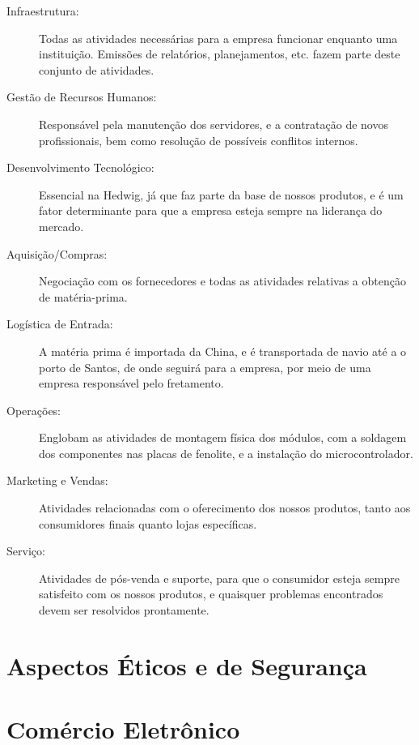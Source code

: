 \begin{description}
    \item[Infraestrutura:]Todas as atividades necessárias para a empresa funcionar enquanto uma instituição. Emissões de relatórios, planejamentos, etc. fazem parte deste conjunto de atividades.

    \item[Gestão de Recursos Humanos:]Responsável pela manutenção dos servidores, e a contratação de novos profissionais, bem como resolução de possíveis conflitos internos.

    \item[Desenvolvimento Tecnológico:]Essencial na Hedwig, já que faz parte da base de nossos produtos, e é um fator determinante para que a empresa esteja sempre na liderança do mercado.

    \item[Aquisição/Compras:]Negociação com os fornecedores e todas as atividades relativas a obtenção de matéria-prima.

    \item[Logística de Entrada:]A matéria prima é importada da China, e é transportada de navio até a o porto de Santos, de onde seguirá para a empresa, por meio de uma empresa responsável pelo fretamento.

    \item[Operações:]Englobam as atividades de montagem física dos módulos, com a soldagem dos componentes nas placas de fenolite, e a instalação do microcontrolador.

    \item[Marketing e Vendas:]Atividades relacionadas com o oferecimento dos nossos produtos, tanto aos consumidores finais quanto lojas específicas.

    \item[Serviço:]Atividades de pós-venda e suporte, para que o consumidor esteja sempre satisfeito com os nossos produtos, e quaisquer problemas encontrados devem ser resolvidos prontamente.
\end{description}

\section{Aspectos Éticos e de Segurança}


\section{Comércio Eletrônico}

